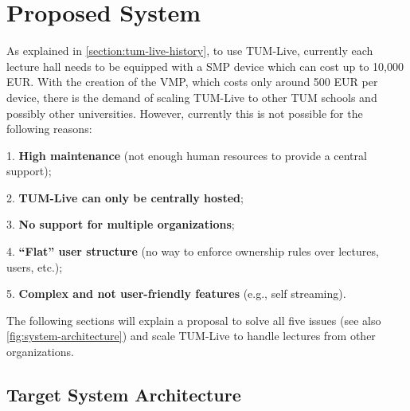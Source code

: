 \section{Proposed System}

As explained in \autoref{section:tum-live-history}, to use TUM-Live, currently each lecture hall needs to be equipped with a \ac{SMP} device which can cost up to 10,000 EUR. With the creation of the \ac{VMP}, which costs only around 500 EUR per device, there is the demand of scaling TUM-Live to other \ac{TUM} schools and possibly other universities. However, currently this is not possible for the following reasons: 

1. \textbf{High maintenance} (not enough human resources to provide a central support);

2. \textbf{TUM-Live can only be centrally hosted};

3. \textbf{No support for multiple organizations};

4. \textbf{“Flat” user structure} (no way to enforce ownership rules over lectures, users, etc.);

5. \textbf{Complex and not user-friendly features} (e.g., self streaming).

\noindent The following sections will explain a proposal to solve all five issues (see also \autoref{fig:system-architecture}) and scale TUM-Live to handle lectures from other organizations.

\subsection{Target System Architecture}

